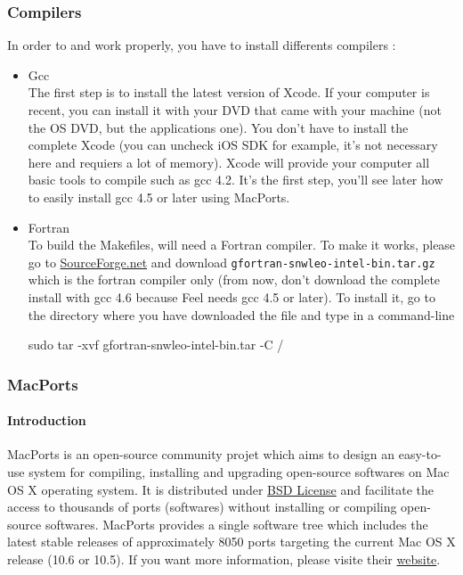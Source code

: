 \subsubsection{Compilers}

In order to \feel and \cmake work properly, you have to install differents compilers :
\begin{itemize}
\item Gcc \\
  The first step is to install the latest version of Xcode. If your computer is
  recent, you can install it with your DVD that came with your machine (not the
  OS DVD, but the applications one). You don't have to install the complete
  Xcode (you can uncheck iOS SDK for example, it's not necessary here and
  requiers a lot of memory). Xcode will provide your computer all basic tools to
  compile such as gcc 4.2. It's the first step, you'll see later how to easily
  install gcc 4.5 or later using MacPorts.
\item Fortran \\
  To build the Makefiles, \cmake will need a Fortran compiler. To make it works,
  please go to \href{http://hpc.sourceforge.net/}{SourceForge.net} and download
  \lstinline|gfortran-snwleo-intel-bin.tar.gz| which is the fortran compiler
  only (from now, don't download the complete install with gcc 4.6 because Feel
  needs gcc 4.5 or later). To install it, go to the directory where you have
  downloaded the file and type in a command-line
\begin{unixcom}
		sudo tar -xvf gfortran-snwleo-intel-bin.tar -C /
\end{unixcom}

\end{itemize}

\subsubsection{MacPorts}

\paragraph{Introduction}
MacPorts is an open-source community projet which aims to design an easy-to-use
system for compiling, installing and upgrading open-source softwares on Mac OS X
operating system. It is distributed under
\href{http://opensource.org/licenses/bsd-license.php}{BSD License} and
facilitate the access to thousands of ports (softwares) without installing or
compiling open-source softwares.  MacPorts provides a single software tree which
includes the latest stable releases of approximately 8050 ports targeting the
current Mac OS X release (10.6 or 10.5). If you want more information, please
visite their \href{http://www.macports.org/}{website}.

